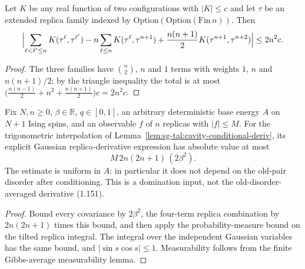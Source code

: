 \begin{lemma}
\label{lem:sg-tal:cavity-family-count}
  \leanok
{}
Let $K$ be any real function of two configurations with $|K|\le c$ and let $\tau$ be an
extended replica family indexed by $\mathrm{Option}(\mathrm{Option}(\mathrm{Fin}\,n))$. Then
\[
\Bigl|\sum_{\ell<\ell'\le n}K(\tau^\ell,\tau^{\ell'})-n\sum_{\ell\le n}K(\tau^\ell,\tau^{n+1})
 +\frac{n(n+1)}2K(\tau^{n+1},\tau^{n+2})\Bigr|\le 2n^2c.
\]
\end{lemma}
\begin{proof}
  \leanok
The three families have $\binom n2$, $n$ and $1$ terms with weights $1$, $n$ and $n(n+1)/2$;
by the triangle inequality the total is at most $\bigl(\tfrac{n(n-1)}2+n^2+\tfrac{n(n+1)}2\bigr)c
=2n^2c$.
\end{proof}

\begin{lemma}
\label{lem:sg-tal:cavity-outer-bound}
  \leanok
{}
Fix $N,n\ge0$, $\beta\in\mathbb R$, $q\in[0,1]$, an arbitrary deterministic
base energy $A$ on $N+1$ Ising spins, and an observable $f$ of $n$ replicas
with $|f|\le M$. For the trigonometric interpolation of
Lemma~\ref{lem:sg-tal:cavity-conditional-deriv}, its explicit Gaussian
replica-derivative expression has absolute value at most
\[
M\,2n(2n+1)\,(2\beta^2).
\]
The estimate is uniform in $A$: in particular it does not depend on the
old-pair disorder after conditioning. This is a domination input, not the
old-disorder-averaged derivative (1.151).
\end{lemma}
\begin{proof}
  \leanok
Bound every covariance by $2\beta^2$, the four-term replica combination
by $2n(2n+1)$ times this bound, and then apply the probability-measure
bound on the tilted replica integral. The integral over the independent
Gaussian variables has the same bound, and $|\sin s\cos s|\le1$.
Measurability follows from the finite Gibbs-average measurability lemma.
\end{proof}

